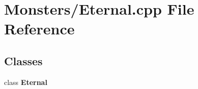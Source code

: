 \section{Monsters/\-Eternal.cpp File Reference}
\label{_eternal_8cpp}
\subsection*{Classes}
\begin{DoxyCompactItemize}
\item 
class {\bf Eternal}
\end{DoxyCompactItemize}
